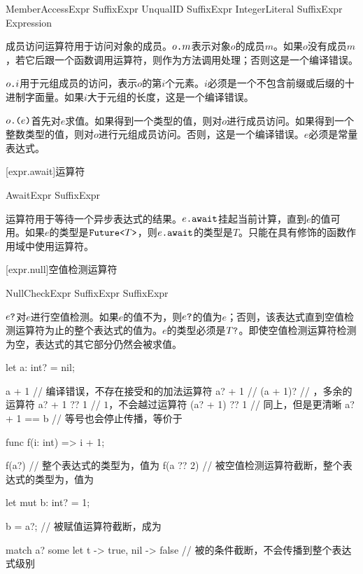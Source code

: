 \begin{bnf}{MemberAccessExpr}
    SuffixExpr  UnqualID \br
    SuffixExpr  IntegerLiteral \br
    SuffixExpr  \terminal{(} Expression \terminal{)}
\end{bnf}

\pnum
成员访问运算符用于访问对象的成员。$o\texttt{.}m$表示对象$o$的成员$m$。如果$o$没有成员$m$，若它后跟一个函数调用运算符，则作为方法调用处理；否则这是一个编译错误。

\pnum
$o\texttt{.}i$用于元组成员的访问，表示$o$的第$i$个元素。$i$必须是一个不包含前缀或后缀的十进制字面量。如果$i$大于元组的长度，这是一个编译错误。

\pnum
$o\texttt{.(}e\texttt{)}$首先对$e$求值。如果得到一个类型的值，则对$o$进行成员访问。如果得到一个整数类型的值，则对$o$进行元组成员访问。否则，这是一个编译错误。$e$必须是常量表达式。

[expr.await]{运算符}

\begin{bnf}{AwaitExpr}
    SuffixExpr  
\end{bnf}

\pnum
{}运算符用于等待一个异步表达式的结果。$e\texttt{.await}$挂起当前计算，直到$e$的值可用。如果$e$的类型是$\texttt{Future<}T\texttt{>}$，则$e\texttt{.await}$的类型是$T$。只能在具有修饰的函数作用域中使用运算符。

[expr.null]{空值检测运算符}

\begin{bnf}{NullCheckExpr}
    SuffixExpr  \br
    SuffixExpr \terminal{!}
\end{bnf}

\pnum
$e\texttt{?}$对$e$进行空值检测。如果$e$的值不为，则$e\texttt{?}$的值为$e$；否则，该表达式直到空值检测运算符为止的整个表达式的值为。$e$的类型必须是$T\texttt{?}$。即使空值检测运算符检测为空，表达式的其它部分仍然会被求值。

\enterexample
\begin{codeblock}
let a: int? = nil;

a + 1 // 编译错误，不存在接受和的加法运算符
a? + 1 // 
(a + 1)? // ，多余的运算符
a? + 1 ?? 1 // $1$，不会越过运算符
(a? + 1) ?? 1 // 同上，但是更清晰
a? + 1 == b // 等号也会停止传播，等价于

func f(i: int) => i + 1;

f(a?) // 整个表达式的类型为，值为
f(a ?? 2) // 被空值检测运算符截断，整个表达式的类型为，值为

let mut b: int? = 1;

b = a?; // 被赋值运算符截断，成为

match a? { some let t -> true, nil -> false } // 被的条件截断，不会传播到整个表达式级别
\end{codeblock}
\exitexample

